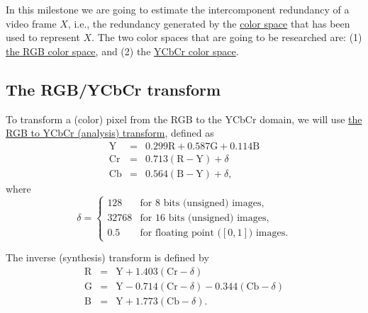 In this milestone we are going to estimate the intercomponent
redundancy of a video frame $X$, i.e., the redundancy generated by the
\href{https://en.wikipedia.org/wiki/Color_space}{color space} that has
been used to represent $X$. The two color spaces that are going to be
researched are: (1)
\href{https://en.wikipedia.org/wiki/RGB_color_model}{the RGB color
  space}, and (2) the \href{https://en.wikipedia.org/wiki/YCbCr}{YCbCr
  color space}.

\subsection{The RGB/YCbCr transform}
To transform a (color) pixel from the RGB to the YCbCr domain, we will use
\href{https://docs.opencv.org/3.4/de/d25/imgproc_color_conversions.html}{the
  RGB to YCbCr (analysis) transform}, defined as
\begin{equation}
  \begin{array}{lcl}
    \text{Y}  & = & 0.299\text{R} + 0.587\text{G} + 0.114\text{B} \\
    \text{Cr} & = & 0.713(\text{R} - \text{Y}) + \delta  \\
    \text{Cb} & = & 0.564(\text{B} - \text{Y}) + \delta,
  \end{array}
  \label{eq:analysis}
\end{equation}
where
\begin{equation}
  \delta = \left\{
  \begin{array}{ll}
    128 & \text{for 8 bits (unsigned) images},\\
    32768 & \text{for 16 bits (unsigned) images},\\
    0.5 & \text{for floating point (}[0,1]\text{) images}.
  \end{array}
  \right.
\end{equation}

The inverse (synthesis) transform is defined by
\begin{equation}
  \begin{array}{lcl}
    \text{R} & = & \text{Y} + 1.403(\text{Cr} - \delta) \\
    \text{G} & = & \text{Y} - 0.714(\text{Cr} - \delta) - 0.344(\text{Cb} - \delta)\\
    \text{B} & = & \text{Y} + 1.773(\text{Cb} - \delta).
  \end{array}
  \label{eq:synthesis}
\end{equation}

